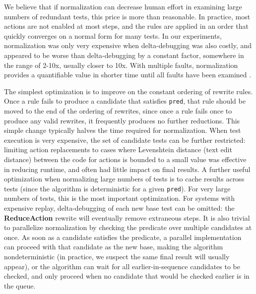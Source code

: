 We believe that if normalization can decrease human effort in
examining large numbers of redundant tests, this price is more
than reasonable.  In practice, most actions are not enabled at most
steps, and the rules are applied in an order that quickly converges on
a normal form for many tests.  In our experiments, normalization
was only very expensive when delta-debugging was also costly, and
appeared to be worse than delta-debugging by a constant factor,
somewhere in the range of 2-10x, usually closer to 10x.  With multiple
faults, normalization provides a quantifiable value in
shorter time until all faults have been examined \cite{PLDI13}.


The simplest optimization is to improve on the constant ordering of
rewrite rules.  Once a rule fails to produce a candidate that
satisfies {\tt pred}, that rule should be moved to the end of the
ordering of rewrites, since once a rule fails once to produce any
valid rewrites, it frequently produces no further reductions.  This
simple change typically halves the time required for normalization.
When test execution is very expensive, the set of candidate tests can be further restricted: limiting action replacements to cases
where Levenshtein \cite{Lev} distance (text edit distance) between the
code for actions is bounded to a small value was effective in
reducing runtime, and often had little impact on final results.
A further useful optimization when normalizing large numbers of tests
is to cache results across tests (since the algorithm is deterministic
for a given {\tt pred}).   For very large
numbers of tests, this is the most important optimization.
For systems with
expensive replay, delta-debugging of each new base test
can be omitted: the {\bf ReduceAction} rewrite will
eventually remove extraneous steps.  
It is also trivial to parallelize normalization by
checking the predicate over multiple candidates at once.  As soon as a
candidate satisfies the predicate, a parallel implementation can proceed with that candidate as the new
base, making the algorithm nondeterministic (in practice, we suspect
the same final result will usually appear), or the algorithm can wait
for all earlier-in-sequence candidates to be checked, and only proceed
when no candidate that would be checked earlier is in the queue.

